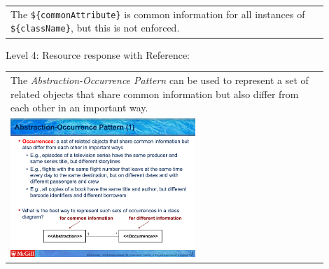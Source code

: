 \begin{tabular}{|p{0.9\linewidth}}
The \verb|${commonAttribute}| is common information for all instances of \verb|${className}|, but this is not enforced.
\end{tabular} \medskip

\noindent Level 4: Resource response with Reference: \medskip

\begin{tabular}{|p{0.9\linewidth}}
The \textit{Abstraction-Occurrence Pattern} can be used to 
represent a set of related objects that share common information but also differ
from each other in an important way.

\\
\includegraphics[width=0.6\textwidth]{images/abstraction_occurrence.png}
\end{tabular} \medskip




